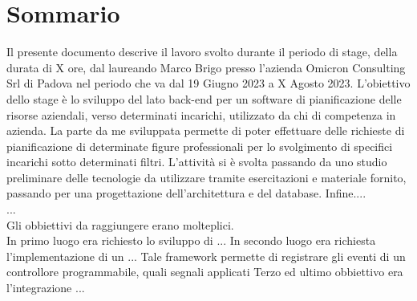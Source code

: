 \cleardoublepage
{}
{}
\begingroup
\let\clearpage\relax
\let\cleardoublepage\relax
\let\cleardoublepage\relax

\chapter*{Sommario}

Il presente documento descrive il lavoro svolto durante il periodo di stage, della durata di X ore, dal laureando Marco Brigo presso l'azienda Omicron Consulting Srl di Padova nel periodo che va dal 19 Giugno 2023 a X Agosto 2023.
L'obiettivo dello stage è lo sviluppo del lato back-end per un software di pianificazione delle risorse aziendali, verso determinati incarichi, utilizzato da chi di competenza in azienda.
La parte da me sviluppata permette di poter effettuare delle richieste di pianificazione di determinate figure professionali per lo svolgimento di specifici incarichi sotto determinati filtri.
L'attività si è svolta passando da uno studio preliminare delle tecnologie da utilizzare tramite esercitazioni e materiale fornito, passando per una progettazione dell'architettura e del database.
Infine....\\
...\\
Gli obbiettivi da raggiungere erano molteplici.\\
In primo luogo era richiesto lo sviluppo di ...
In secondo luogo era richiesta l'implementazione di un ...
Tale framework permette di registrare gli eventi di un controllore programmabile, quali segnali applicati
Terzo ed ultimo obbiettivo era l'integrazione ...




\endgroup

\vfill
